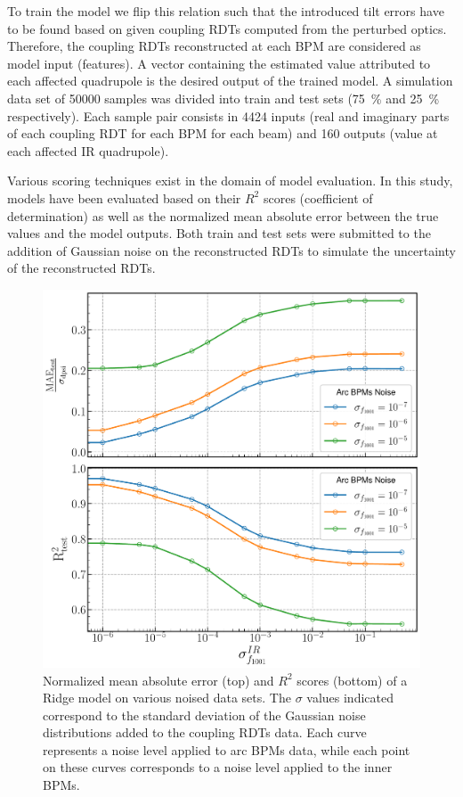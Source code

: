 To train the model we flip this relation such that the introduced tilt errors have to be found based on given coupling RDTs computed from the perturbed optics.
Therefore, the coupling RDTs reconstructed at each BPM are considered as model input (features).
A vector containing the estimated \DPSI value attributed to each affected quadrupole is the desired output of the trained model.
A simulation data set of \num{50000} samples was divided into train and test sets (\qty{75}{\percent} and \qty{25}{\percent} respectively).
Each sample pair consists in \num{4424} inputs (real and imaginary parts of each coupling RDT for each BPM for each beam) and \num{160} outputs (\DPSI value at each affected IR quadrupole).

Various scoring techniques exist in the domain of model evaluation.
In this study, models have been evaluated based on their \(R^2\) scores (coefficient of determination) as well as the normalized mean absolute error between the true values and the model outputs.
Both train and test sets were submitted to the addition of Gaussian noise on the reconstructed RDTs to simulate the uncertainty of the reconstructed RDTs.

\begin{figure}[!htb]
    \centering
    \includegraphics*[width=0.9\columnwidth]{Figures/Chapter5/ridge_performance.pdf}
    \caption{Normalized mean absolute error (top) and \(R^2\) scores (bottom) of a Ridge model on various noised data sets. The \(\sigma\) values indicated correspond to the standard deviation of the Gaussian noise distributions added to the coupling RDTs data. Each curve represents a noise level applied to arc BPMs data, while each point on these curves corresponds to a noise level applied to the inner BPMs.}
    \label{fig:ridge_performance}
\end{figure}

